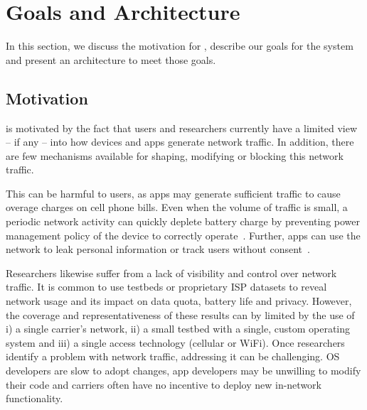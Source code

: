 \section{Goals and Architecture}
\label{sec:goals}
In this section, we discuss the motivation for \meddle, describe our goals for the 
system and present an architecture to meet those goals.

\subsection{Motivation}
\meddle is motivated by the fact that users and researchers currently 
have a limited view -- if any -- into how devices and apps generate network 
traffic. In addition, there are few mechanisms available for shaping, modifying 
or blocking this network traffic. 

This can be harmful to users, as apps may generate sufficient traffic
to cause overage charges on cell phone bills. Even when the volume of
traffic is small, a periodic network activity can quickly deplete
battery charge by preventing power management policy of the device to
correctly operate~\cite{qian:periodic}. Further, apps can use the network to leak personal
information or track users without consent~\cite{hornyack:appfence}.

Researchers  likewise suffer from a lack of visibility and control over 
network traffic. It is common 
to use testbeds or proprietary ISP datasets to reveal network usage 
and its impact on data quota, battery life and privacy. However, the 
coverage and representativeness of these results can by limited by 
the use of i) a single carrier's network, ii) a small testbed with 
a single, custom operating system and iii) a single access technology 
(cellular or WiFi). Once researchers identify a problem with network traffic, 
addressing it can be challenging. OS developers are slow to 
adopt changes, app developers may be unwilling to modify their code 
and carriers often have no incentive to deploy new in-network 
functionality. 

